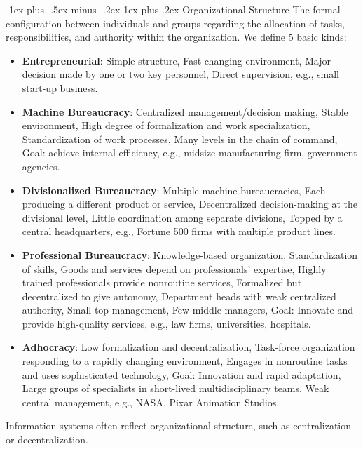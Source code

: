 \documentclass[12pt, landscape]{article}
\makeatletter
\renewcommand{\subsubsection}{\@startsection{subsubsection}{3}{0mm}%
                                {-1ex plus -.5ex minus -.2ex}%
                                {1ex plus .2ex}%
                                {\normalfont\small\bfseries}}
\makeatother
\begin{document}
\begin{multicols*}{3}
\subsubsection{Organizational Structure}
The formal configuration between individuals and groups regarding the allocation of tasks, responsibilities, and authority within the organization. We define 5 basic kinds:
\begin{itemize}
\item \textbf{Entrepreneurial}: Simple structure, Fast-changing environment, Major decision made by one or two key personnel, Direct supervision, e.g., small start-up business.  
\item \textbf{Machine Bureaucracy}: Centralized management/decision making, Stable environment, High degree of formalization and work specialization, Standardization of work processes, Many levels in the chain of command, Goal: achieve internal efficiency, e.g., midsize manufacturing firm, government agencies.  
\item \textbf{Divisionalized Bureaucracy}: Multiple machine bureaucracies, Each producing a different product or service, Decentralized decision-making at the divisional level, Little coordination among separate divisions, Topped by a central headquarters, e.g., Fortune 500 firms with multiple product lines.  
\item \textbf{Professional Bureaucracy}: Knowledge-based organization, Standardization of skills, Goods and services depend on professionals' expertise, Highly trained professionals provide nonroutine services, Formalized but decentralized to give autonomy, Department heads with weak centralized authority, Small top management, Few middle managers, Goal: Innovate and provide high-quality services, e.g., law firms, universities, hospitals.  
\item \textbf{Adhocracy}: Low formalization and decentralization, Task-force organization responding to a rapidly changing environment, Engages in nonroutine tasks and uses sophisticated technology, Goal: Innovation and rapid adaptation, Large groups of specialists in short-lived multidisciplinary teams, Weak central management, e.g., NASA, Pixar Animation Studios.  
\end{itemize}
Information systems often reflect organizational structure, such as centralization or decentralization. 


\end{multicols*}
\end{document}
